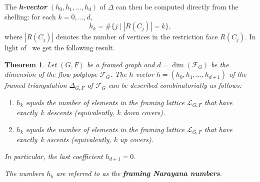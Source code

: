 \documentclass[12pt, reqno]{amsart}
\newcommand{\cesar}[1]{\todo[size=\footnotesize,color=orange!30,inline]{#1  \hfill --- C.}}
\newcommand{\defn}[1]{{\color{blue!50!black}\textbf{\emph{#1}}}}
\newcommand{\set}[1]{\left\lbrace#1\right\rbrace}
\theoremstyle{plain}
\newtheorem{theorem}{Theorem}[section]
\theoremstyle{definition}
\numberwithin{equation}{section}
\newcommand\calF{\mathcal{F}}
\newcommand\scrL{\mathscr{L}}
\begin{document}

The \defn{h-vector} $(h_0, h_1, \dots, h_d)$ of $\Delta$ can then be computed directly from the shelling: for each $k=0, \dots, d$,
\[
h_k = \#\{ j \mid |R(C_j)| = k \},
\]
where $|R(C_j)|$ denotes the number of vertices in the restriction face $R(C_j)$. In light of~ we get the following result.

\begin{theorem}\label{thm_h_vector}
    Let $(G,F)$ be a framed graph and $d=\dim(\calF_G)$ be the dimension of the flow polytope $\calF_G$. The $h$-vector $h=(h_0,h_1,\dots,h_{d+1})$ of the framed triangulation $\Delta_{G,F}$ of $\calF_G$ can be described combinatorially as follows:
    \begin{enumerate}
        \item $h_k$ equals the number of elements in the framing lattice $\scrL_{G,F}$ that have exactly~$k$ descents (equivalently, $k$ down covers).
        \item $h_k$ equals the number of elements in the framing lattice $\scrL_{G,F}$ that have exactly~$k$ ascents (equivalently, $k$ up covers).
    \end{enumerate}
    In particular, the last coefficient $h_{d+1} = 0$.
    
    The numbers $h_k$ are referred to as the \defn{framing Narayana numbers}.
\end{theorem}


\end{document}
